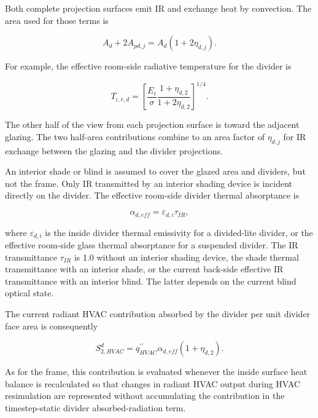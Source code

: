 Both complete projection surfaces emit IR and exchange heat by convection. The area used for those terms is

\begin{equation}
{A_d} + 2{A_{pd,j}} = {A_d}\left( {1 + 2{\eta_{d,j}}} \right).
\end{equation}

For example, the effective room-side radiative temperature for the divider is

\begin{equation}
T_{i,r,d} = {\left[ {\frac{{{E_i}}}{\sigma}\frac{{1 + {\eta_{d,2}}}}{{1 + 2{\eta_{d,2}}}}} \right]^{1/4}}.
\end{equation}

The other half of the view from each projection surface is toward the adjacent glazing. The two half-area contributions combine to an area factor of \emph{$\eta_{d,j}$} for IR exchange between the glazing and the divider projections.

An interior shade or blind is assumed to cover the glazed area and dividers, but not the frame. Only IR transmitted by an interior shading device is incident directly on the divider. The effective room-side divider thermal absorptance is

\begin{equation}
\alpha_{d,eff} = \varepsilon_{d,i}\tau_{IR},
\end{equation}

where \emph{$\varepsilon_{d,i}$} is the inside divider thermal emissivity for a divided-lite divider, or the effective room-side glass thermal absorptance for a suspended divider. The IR transmittance \emph{$\tau_{IR}$} is 1.0 without an interior shading device, the shade thermal transmittance with an interior shade, or the current back-side effective IR transmittance with an interior blind. The latter depends on the current blind optical state.

The current radiant HVAC contribution absorbed by the divider per unit divider face area is consequently

\begin{equation}
S_{2,HVAC}^{d} = q^{\prime\prime}_{HVAC}{\alpha_{d,eff}}\left( {1 + {\eta_{d,2}}} \right).
\end{equation}

As for the frame, this contribution is evaluated whenever the inside surface heat balance is recalculated so that changes in radiant HVAC output during HVAC resimulation are represented without accumulating the contribution in the timestep-static divider absorbed-radiation term.


